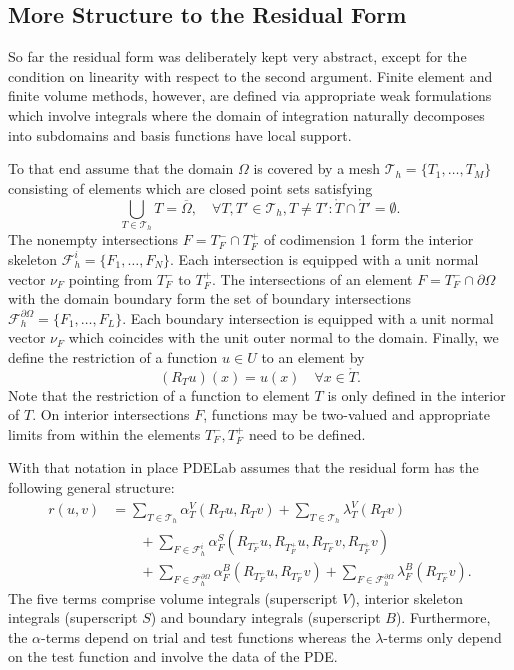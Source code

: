 \documentclass[a4paper,12pt]{article}
\theoremstyle{definition}
\begin{document}
\subsection*{More Structure to the Residual Form}

So far the residual form was deliberately kept very abstract, except for
the condition on linearity with respect to the second argument.
Finite element and finite volume methods, however, are defined via
appropriate weak formulations which involve integrals where the domain
of integration naturally decomposes into subdomains and basis functions
have local support. 

To that end assume that the domain $\Omega$ is covered by a mesh
$\mathcal{T}_h = \{T_1, \ldots, T_M\}$ consisting of elements
which are closed point sets satisfying
\begin{equation}
\bigcup_{T\in \mathcal{T}_h} T = \overline{\Omega}, \quad 
\forall T, T' \in \mathcal{T}_h, T\neq T' : \mathring{T} \cap \mathring{T}' = \emptyset .
\end{equation}
The nonempty intersections $F = T_F^-\cap T_F^+$ 
of codimension 1 form the interior skeleton $\mathcal{F}_h^i=\{F_1,\ldots,F_N\}$.
Each intersection is equipped with a unit normal vector $\nu_F$ pointing from $T_F^-$ to $T_F^+$.
The intersections of an element $F=T_F^-\cap\partial\Omega$ with the domain
boundary form the set of boundary intersections $\mathcal{F}_h^{\partial\Omega}=
\{F_1,\ldots,F_L\}$. Each boundary intersection is equipped with a unit normal vector
$\nu_F$ which coincides with the unit outer normal to the domain. Finally, we define the restriction
of a function $u\in U$ to an element by
\begin{equation*}
(R_T u)(x) = u(x) \quad \forall x\in\mathring{T} .
\end{equation*}
Note that the restriction of a function to element $T$ is only defined in
the interior of $T$. On interior intersections $F$, functions may be two-valued
and appropriate limits from within the elements $T_F^-, T_F^+$ need to be defined.

With that notation in place PDELab assumes that the residual form has
the following general structure:
\begin{equation}
\begin{split}
r(u,v) &= 
\sum_{T\in\mathcal{T}_h} \alpha_T^V(R_T u, R_T v) 
+ \sum_{T\in\mathcal{T}_h} \lambda_T^V(R_T v) \\
&\qquad+ \sum_{F\in\mathcal{F}_h^i} \alpha_F^S(R_{T_F^-} u,R_{T_F^+} u, R_{T_F^-} v, R_{T_F^+} v)\\
&\qquad+ \sum_{F\in\mathcal{F}_h^{\partial\Omega}} \alpha_F^B(R_{T_F^-} u, R_{T_F^-} v)
+ \sum_{F\in\mathcal{F}_h^{\partial\Omega}} \lambda_F^B(R_{T_F^-} v) .
\end{split}\label{eq:GeneralResidualForm}
\end{equation}
The five terms comprise volume integrals (superscript $V$), interior skeleton integrals
(superscript $S$) and boundary integrals (superscript $B$). Furthermore, the
$\alpha$-terms depend on trial and test functions whereas the $\lambda$-terms only
depend on the test function and involve the data of the PDE.
\end{document}
